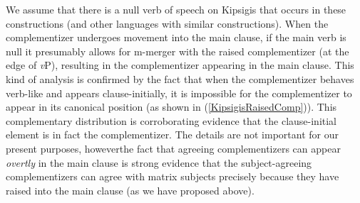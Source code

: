 \documentclass[output=paper
,modfonts
,nonflat
]{langsci/langscibook}
\begin{document}
\noindent We assume that there is a null verb of speech on Kipsigis that occurs in these constructions (and other languages with similar constructions). When the complementizer undergoes movement into the main clause, if the main verb is null it presumably allows for m-merger with the raised complementizer (at the edge of \textit{v}P), resulting in the complementizer appearing in the main clause. This kind of analysis is confirmed by the fact that when the complementizer behaves verb-like and appears clause-initially, it is impossible for the complementizer to appear in its canonical position (as shown in (\ref{KipsigisRaisedComp})). This complementary distribution is corroborating evidence that the clause-initial element is in fact the complementizer. The details are not important for our present purposes, however\textemdash the fact that agreeing complementizers can appear \textit{overtly} in the main clause is strong evidence that the subject-agreeing complementizers can agree with matrix subjects precisely because they have raised into the main clause (as we have proposed above).  
\end{document}
